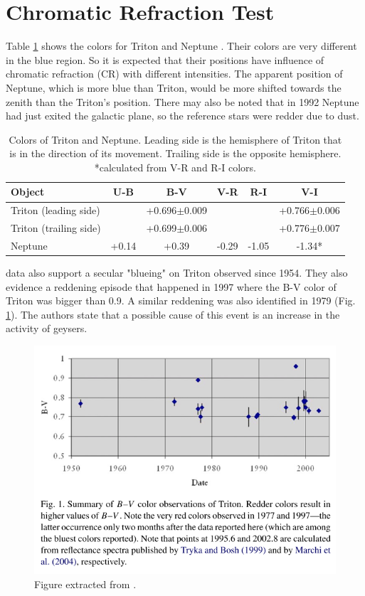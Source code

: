 \documentclass[12pt,a4paper]{report}
\begin{document}
\section*{Chromatic Refraction Test}

Table \ref{Tab:colors} shows the colors for Triton \citep{Pascu2006} and Neptune \cite{Schmude2016}. Their colors are very different in the blue region. So it is expected that their positions have influence of chromatic refraction (CR) with different intensities. The apparent position of Neptune, which is more blue than Triton, would be more shifted towards the zenith than the Triton's position. There may also be noted that in 1992 Neptune had just exited the galactic plane, so the reference stars were redder due to dust.

\begin{table}[h]
\centering
\begin{tabular}{|l|c|c|c|c|c|}
\hline
Object & U-B & B-V & V-R & R-I & V-I\\
\hline
Triton (leading side) & & +0.696$\pm$0.009 & & & +0.766$\pm$0.006 \\
Triton (trailing side) & & +0.699$\pm$0.006 & & & +0.776$\pm$0.007 \\
Neptune & +0.14 & +0.39 & -0.29 & -1.05 & -1.34*\\
\hline
\end{tabular}
\caption{Colors of Triton and Neptune. Leading side is the hemisphere of Triton that is in the direction of its movement. Trailing side is the opposite hemisphere. \\ *calculated from V-R and R-I colors.}
\label{Tab:colors}
\end{table}

\citep{Pascu2006} data also support a secular "blueing" on Triton observed since 1954. They also evidence a reddening episode that happened in 1997 where the B-V color of Triton was bigger than 0.9. A similar reddening was also identified in 1979 (Fig. \ref{Fig:Pascu}). The authors state that a possible cause of this event is an increase in the activity of geysers.

\begin{figure}[h]
\centering
\includegraphics[scale=0.7]{Pascu.png}
\caption{Figure extracted from \cite{Pascu2006}. \label{Fig:Pascu}}
\end{figure}
\end{document}
